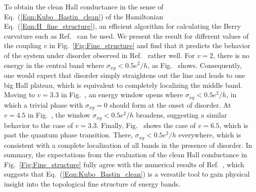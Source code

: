 \documentclass[aps,prb,amsmath,amssymb,twocolumn, superscriptaddress]{revtex4-2}
\newcommand{\eq}[1]{Eq.~(\ref{#1})}
\begin{document}
To obtain the clean Hall conductance in the sense of \eq{Eqn:Kubo_Bastin_clean} of the Hamiltonian \eq{Eqn:H_fine_structure}, an efficient algorithm for calculating the Berry curvature such as Ref.~\cite{Chern_number_numerically_App} can be used. We present the result for different values of the coupling $v$ in Fig.~\ref{Fig:Fine_structure} and find that it predicts the behavior of the system under disorder observed in Ref.~\cite{Fine_structure_App} rather well. For $v = 2$, there is no energy in the central band where $\sigma_{xy} < 0.5 e^2 / h$, as Fig.~ shows. Consequently, one would expect that disorder simply straightens out the line and leads to one big Hall plateau, which is equivalent to completely localizing the middle band. Moving to $v = 3.3$ in Fig.~, an energy window opens where $\sigma_{xy} < 0.5 e^2 / h$, in which a trivial phase with $\sigma_{xy} = 0$ should form at the onset of disorder. At $v = 4.5$ in Fig.~, the window $\sigma_{xy} < 0.5 e^2 / h$ broadens, suggesting a similar behavior to the case of $v = 3.3$. Finally, Fig.~ shows the case of $v = 6.5$, which is past the quantum phase transition. There, $\sigma_{xy} < 0.5 e^2 / h$ everywhere, which is consistent with a complete localization of all bands in the presence of disorder. In summary, the expectations from the evaluation of the clean Hall conductance in Fig.~\ref{Fig:Fine_structure} fully agree with the numerical results of Ref.~\cite{Fine_structure_App}, which suggests that \eq{Eqn:Kubo_Bastin_clean} is a versatile tool to gain physical insight into the topological fine structure of energy bands.
\end{document}
